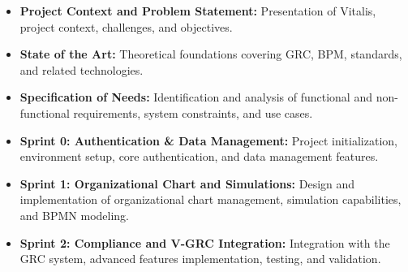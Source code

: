 \begin{itemize}
\item \textbf{Project Context and Problem Statement:} Presentation of Vitalis, project context, challenges, and objectives.
\item \textbf{State of the Art:} Theoretical foundations covering GRC, BPM, standards, and related technologies.
\item \textbf{Specification of Needs:} Identification and analysis of functional and non-functional requirements, system constraints, and use cases.
\item \textbf{Sprint 0: Authentication \& Data Management:} Project initialization, environment setup, core authentication, and data management features.
\item \textbf{Sprint 1: Organizational Chart and Simulations:} Design and implementation of organizational chart management, simulation capabilities, and BPMN modeling.
\item \textbf{Sprint 2: Compliance and V-GRC Integration:} Integration with the GRC system, advanced features implementation, testing, and validation.
\end{itemize}

